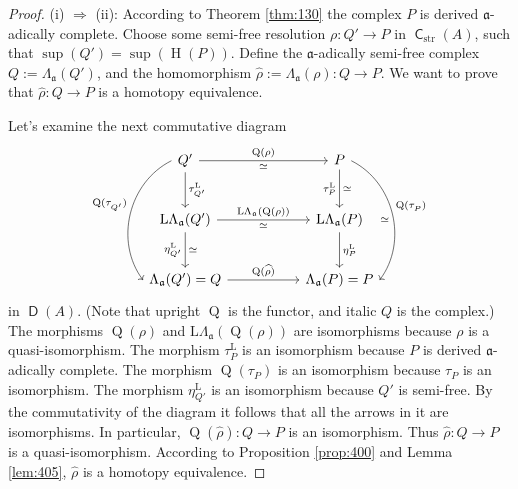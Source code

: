 \documentclass[10pt]{amsart}
\theoremstyle{definition}
\numberwithin{equation}{section}
\newcommand{\opn}{\operatorname}
\newcommand{\cat}[1]{\operatorname{\mathsf{#1}}}
\newcommand{\mfrak}[1]{\mathfrak{#1}}
\newcommand{\mrm}[1]{\mathrm{#1}}
\newcommand{\La}{\Lambda}
\renewcommand{\a}{\mfrak{a}}
\newcommand{\what}[1]{\widehat{#1}}
\begin{document}
\begin{proof}
(i) $\Rightarrow$ (ii):
According to Theorem \ref{thm:130} the complex $P$ is derived $\a$-adically
complete. Choose some semi-free resolution
$\rho : Q' \to P$ in $\cat{C}_{\mrm{str}}(A)$,
such that $\opn{sup}(Q') = \opn{sup}(\opn{H}(P))$.
Define the $\a$-adically semi-free complex $Q := \La_{\a}(Q')$, and the
homomorphism
$\what{\rho} := \La_{\a}(\rho) : Q \to P$. We want to prove that
$\what{\rho} : Q \to P$ is a homotopy equivalence.

Let's examine the next commutative diagram
\begin{equation} \label{eqn:407}
\begin{tikzcd} [column sep = 12ex, row sep = 6ex]
Q'
\ar[d, "{\tau^{\mrm{L}}_{Q'}}"]
\ar[r, "{\opn{Q}(\rho)}", "{\simeq}"']
\arrow[dd, bend right = 50, start anchor = west, end anchor = west,
"{\opn{Q}(\tau^{}_{Q'})}"']
&
P
\ar[d, "{\tau^{\mrm{L}}_P}"', "{\simeq}"]
\arrow[dd, bend left = 50, start anchor = east, end anchor = east,
"{\opn{Q}(\tau^{}_{P})}", "{\simeq}"']
\\
\mrm{L} \La_{\a}(Q')
\ar[r, "{\mrm{L} \La_{\a}(\opn{Q}(\rho))}", "{\simeq}"']
\ar[d, "{\eta^{\mrm{L}}_{Q'}}"', "{\simeq}"]
&
\mrm{L} \La_{\a}(P)
\ar[d, "{\eta^{\mrm{L}}_{P}}"]
\\
\La_{\a}(Q') = Q
\ar[r, "{\opn{Q}(\what{\rho})}"]
&
\La_{\a}(P) = P
\end{tikzcd}
\end{equation}
in $\cat{D}(A)$.
(Note that upright $\opn{Q}$ is the functor, and italic $Q$ is the complex.)
The morphisms $\opn{Q}(\rho)$ and $\mrm{L} \La_{\a}(\opn{Q}(\rho))$
are isomorphisms because $\rho$ is a quasi-iso\-morphism.
The morphism $\tau^{\mrm{L}}_P$ is an isomorphism because $P$ is derived
$\a$-adically complete.
The morphism $\opn{Q}(\tau_P)$ is an isomorphism because $\tau_P$ is an
isomorphism.
The morphism $\eta^{\mrm{L}}_{Q'}$ is an isomorphism because $Q'$ is
semi-free. By the commutativity of the diagram it follows that
all the arrows in it are isomorphisms.
In particular, $\opn{Q}(\what{\rho}) : Q \to P$ is an isomorphism.
Thus $\what{\rho} : Q \to P$ is a quasi-isomorphism.
According to Proposition \ref{prop:400} and
Lemma \ref{lem:405}, $\what{\rho}$ is a homotopy
equivalence.


\end{proof}
\end{document}
